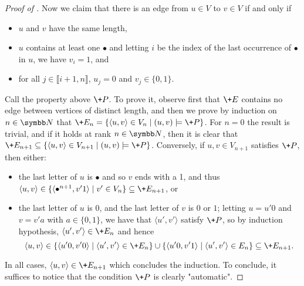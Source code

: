 \begin{proof}[Proof of ]
  Now we claim that there is an edge from $u \in V$ to $v \in V$ if and only if
  \begin{itemize}
    \item $u$ and $v$ have the same length,
    \item $u$ contains at least one $\bullet$
      and letting $i$ be the index of the last occurrence of $\bullet$ in $u$,
      we have $v_i = 1$, and
    \item for all $j \in \lBrack i+1,n\rBrack$, $u_j = 0$
    and $v_j \in \{0,1\}$.
  \end{itemize}
  Call the property above $\+P$.
  To prove it, observe first that $\+E$ contains no edge
  between vertices of distinct length, and then we prove
  by induction on $n\in\N$ that $\+E_n = \{\langle u,v\rangle \in V_n \mid (u,v) \models \+P\}$.
  For $n=0$ the result is trivial, and if it holds at rank $n\in\N$,
  then it is clear that $\+E_{n+1} \subseteq
  \{\langle u,v\rangle \in V_{n+1} \mid (u,v) \models \+P\}$.
  Conversely, if $u,v \in V_{n+1}$ satisfies $\+P$, then
  either:
  \begin{itemize}
    \item the last letter of $u$ is $\bullet$ and so $v$ ends with a
    1, and thus $\langle u,v \rangle \in \{\langle \bullet^{n+1}, v'1\rangle \mid v'\in V_n\}
    \subseteq \+E_{n+1}$, or 
    \item the last letter of $u$ is $0$, and the last letter of $v$ is $0$ or $1$;
      letting $u = u'0$ and $v = v'a$ with $a \in \{0,1\}$, we have
      that $\langle u', v'\rangle$ satisfy $\+P$, so by induction hypothesis,
      $\langle u', v'\rangle \in \+E_n$ and hence
      \[\langle u,v \rangle \in \{\langle u'0,v'0\rangle \mid \langle u',v'\rangle \in \+E_n\}
      \cup \{\langle u'0,v'1\rangle \mid \langle u',v'\rangle \in E_n\} \subseteq \+E_{n+1}.\]
  \end{itemize}
  In all cases, $\langle u,v\rangle \in \+E_{n+1}$ which concludes the induction.
  To conclude, it suffices to notice that the condition $\+P$ is clearly "automatic".
\end{proof}